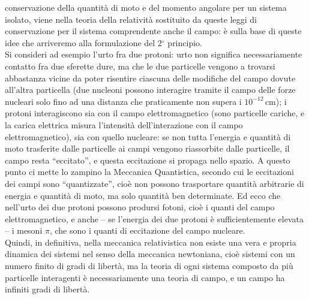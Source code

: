 conservazione della quantit\`a di moto e del momento angolare per un sistema
isolato, viene nella teoria della relativit\`a sostituito da queste leggi di
conservazione per il sistema comprendente anche il campo: \`e sulla base di
queste idee che arriveremo alla formulazione del 2$^\circ$ principio.\\
Si consideri ad esempio l'urto fra due protoni: urto non significa
necessariamente contatto fra due sferette dure, ma che le due particelle vengono
a trovarsi abbastanza vicine da poter risentire ciascuna delle modifiche del
campo dovute all'altra particella (due nucleoni possono interagire tramite il
campo delle forze nucleari solo fino ad una distanza che praticamente non supera
i $10^{-12}$\,cm); i protoni interagiscono sia con il campo elettromagnetico
(sono particelle cariche, e la carica elettrica misura l'intensit\`a
dell'interazione con il campo elettromagnetico), sia con quello nucleare: se non
tutta l'energia e quantit\`a di moto trasferite dalle particelle ai campi
vengono riassorbite dalle particelle, il campo resta ``eccitato'', e questa
eccitazione si propaga nello spazio. A questo punto ci mette lo zampino la
Meccanica Quantistica, secondo cui le eccitazioni dei campi sono
``quantizzate'', cio\`e non possono trasportare quantit\`a arbitrarie di energia
e quantit\`a di moto, ma solo quantit\`a ben determinate. Ed ecco che nell'urto
dei due protoni possono prodursi fotoni, cio\`e i quanti del campo
elettromagnetico, e anche -- se l'energia dei due protoni \`e sufficientemente
elevata -- i mesoni $\pi$, che sono i quanti di eccitazione del campo
nucleare.\\
Quindi, in definitiva, nella meccanica relativistica non esiste una vera e
propria dinamica dei sistemi nel senso della meccanica newtoniana, cio\`e
sistemi con un numero finito di gradi di libert\`a, ma la teoria di ogni sistema
composto da pi\`u particelle interagenti \`e necessariamente una teoria di
campo, e un campo ha infiniti gradi di libert\`a.

